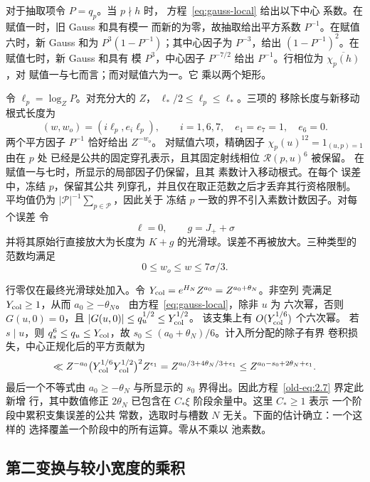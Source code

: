\documentclass[11pt,a4paper]{article}
\numberwithin{equation}{section}
\numberwithin{figure}{section}
\theoremstyle{definition}
\theoremstyle{remark}
\begin{document}
对于抽取项令 \(P=q_p\)。当 \(p\nmid h\) 时，
方程~\eqref{eq:gauss-local} 给出以下中心
系数。在赋值一时，旧 Gauss 和具有模一
而新的为零，故抽取给出平方系数
\(P^{-1}\)。在赋值六时，新 Gauss 和为
\(P^3(1-P^{-1})\)；其中心因子为 \(P^{-3}\)，给出
\((1-P^{-1})^2\)。在赋值七时，新 Gauss 和具有
模 \(P^3\)，中心因子 \(P^{-7/2}\) 给出
\(P^{-1}\)。行相位为 \(\overline{\chi_p(h)}\)，对
赋值一与七而言；而对赋值六为一。它
乘以两个矩形。

令 \(\ell_p=\log_ZP\)。对充分大的 \(Z\)，
\(\ell_*/2\le\ell_p\le\ell_*\)。三项的
移除长度与新移动根式长度为
\begin{equation}
 (w,w_o)=(i\ell_p,e_i\ell_p),\qquad
 i=1,6,7,\quad e_1=e_7=1,\quad e_6=0.
 \label{old-eq:2.9}
\end{equation}
两个平方因子 \(P^{-1}\) 恰好给出 \(Z^{-w_o}\)。
对赋值六项，精确因子
\(\chi_p(u)^{12}=1_{(u,p)=1}\) 由在 \(p\) 处
已经是公共的固定穿孔表示，且其固定射线相位 \(\mathcal R(p,u)^6\) 被保留。
在赋值一与七时，所显示的局部因子仍保留，且其
素数计入移动根式。在每个
误差中，冻结 \(p\)，保留其公共
列穿孔，并且仅在取正范数之后才丢弃其行资格限制。
平均值仍为
\(|\mathcal P|^{-1}\sum_{p\in\mathcal P}\)，因此关于
冻结 \(p\) 一致的界不引入素数计数因子。对每个误差
令
\[
 \ell=0,\qquad g=J_++\sigma
\]
并将其原始行直接放大为长度为
\(K+g\) 的光滑球。误差不再被放大。三种类型的
范数均满足
\begin{equation}
 0\le w_o\le w\le7\sigma/3.
 \label{old-eq:2.10}
\end{equation}

行零仅在最终光滑球处加入。令
\(Y_{\rm col}=e^{H_N}Z^{a_0}=Z^{a_0+\theta_N}\)。非空列
壳满足 \(Y_{\rm col}\ge1\)，从而 \(a_0\ge-\theta_N\)。
由方程~\eqref{eq:gauss-local}，除非 \(u\) 为
六次幂，否则 \(G(u,0)=0\)，且 \(|G(u,0)|\le q_u^{1/2}\le Y_{\rm col}^{1/2}\)。
该支集上有 \(O(Y_{\rm col}^{1/6})\) 个六次幂。
若 \(s\mid u\)，则 \(q_s^6\le q_u\le Y_{\rm col}\)，故
\(s_0\le(a_0+\theta_N)/6\)。计入所分配的除子有界
卷积损失，中心正规化后的平方贡献为
\[
 \ll Z^{-a_0}\bigl(Y_{\rm col}^{1/6}Y_{\rm col}^{1/2}\bigr)^2
          Z^{\epsilon_1}
 =Z^{a_0/3+4\theta_N/3+\epsilon_1}
 \le Z^{a_0-s_0+2\theta_N+\epsilon_1}.
\]
最后一个不等式由 \(a_0\ge-\theta_N\) 与所显示的
\(s_0\) 界得出。因此方程~\eqref{old-eq:2.7} 界定此新增
行，其中数值修正 \(2\theta_N\) 已包含在
\(C_*\xi\) 阶段余量中。这里 \(C_*\ge1\) 表示
一个阶段中累积支集误差的公共
常数，选取时与槽数 \(N\) 无关。下面的估计确立：一个这样的
选择覆盖一个阶段中的所有运算。零从不乘以
池素数。

\subsection{第二变换与较小宽度的乘积}\label{sec:plain-second-transform}
\end{document}
